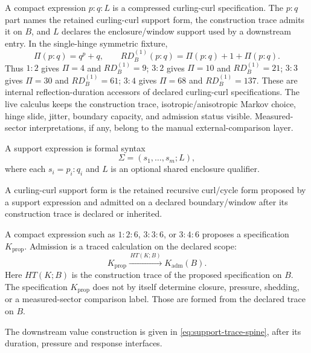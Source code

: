 A compact expression \(p{:}q{:}L\) is a compressed curling-curl specification. The \(p{:}q\) part names the retained curling-curl support form, the construction trace admits it on \(B\), and \(L\) declares the enclosure/window support used by a downstream entry. In the single-hinge symmetric fixture,
\[
\Pi(p{:}q)=q^p+q,
\qquad
RD_B^{(1)}(p{:}q)=\Pi(p{:}q)+1+\Pi(p{:}q).
\]
Thus \(1{:}2\) gives \(\Pi=4\) and \(RD_B^{(1)}=9\); \(3{:}2\) gives \(\Pi=10\) and \(RD_B^{(1)}=21\); \(3{:}3\) gives \(\Pi=30\) and \(RD_B^{(1)}=61\); \(3{:}4\) gives \(\Pi=68\) and \(RD_B^{(1)}=137\). These are internal reflection-duration accessors of declared curling-curl specifications. The live calculus keeps the construction trace, isotropic/anisotropic Markov choice, hinge slide, jitter, boundary capacity, and admission status visible. Measured-sector interpretations, if any, belong to the manual external-comparison layer.

\begin{definition}
A support expression is formal syntax
\begin{equation}
\Sigma=(s_1,\ldots,s_m;L),
\label{eq:support-expression}
\end{equation}
where each \(s_i=p_i{:}q_i\) and \(L\) is an optional shared enclosure qualifier.
\end{definition}

\begin{definition}
A curling-curl support form is the retained recursive curl/cycle form proposed by a support expression and admitted on a declared boundary/window after its construction trace is declared or inherited.
\end{definition}

A compact expression such as \(1{:}2{:}6\), \(3{:}3{:}6\), or \(3{:}4{:}6\) proposes a specification \(K_{\mathrm{prop}}\). Admission is a traced calculation on the declared scope:
\begin{equation}
K_{\mathrm{prop}}
\xrightarrow{\,HT(K;B)\,}
K_{\mathrm{adm}}(B).
\label{eq:key-proposed-admitted-trace}
\end{equation}
Here \(HT(K;B)\) is the construction trace of the proposed specification on \(B\). The specification \(K_{\mathrm{prop}}\) does not by itself determine closure, pressure, shedding, or a measured-sector comparison label. Those are formed from the declared trace on \(B\).

The downstream value construction is given in \eqref{eq:support-trace-spine}, after its duration, pressure and response interfaces.


